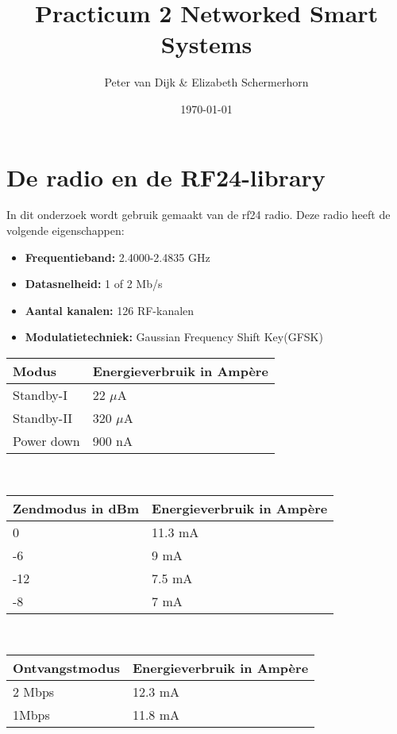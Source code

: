 \documentclass{article}
\author{Peter van Dijk \& Elizabeth Schermerhorn}
\date{\today}
\title{Practicum 2 Networked Smart Systems}
\begin{document}
\maketitle
\newpage
\tableofcontents
\clearpage
\appendix
\section{De radio en de RF24-library}
In dit onderzoek wordt gebruik gemaakt van de rf24 radio. Deze radio heeft de volgende eigenschappen:
	\begin{itemize}	
	\item\textbf{Frequentieband: }2.4000-2.4835 GHz
	\item\textbf{Datasnelheid: }1 of 2 Mb/s
	\item\textbf{Aantal kanalen: }126 RF-kanalen
	\item\textbf{Modulatietechniek: }Gaussian Frequency Shift Key(GFSK)
	\end{itemize}
\begin{tabular}{l||l}
\textbf{Modus}  & \textbf{Energieverbruik in Amp\`ere}     \\
\hline
Standby-I   & 22 $\mu$A    \\
Standby-II  & 320 $\mu$A     \\
Power down  & 900 nA 
\end{tabular}\\
\begin{tabular}{l||l}
\textbf{Zendmodus in dBm}  & \textbf{Energieverbruik in Amp\`ere}     \\
\hline
0   & 11.3 mA    \\
-6  & 9 mA     \\
-12  & 7.5 mA  \\
-8  & 7 mA
\end{tabular}\\
\begin{tabular}{l||l}
\textbf{Ontvangstmodus}  & \textbf{Energieverbruik in Amp\`ere}     \\
\hline
2 Mbps   & 12.3 mA    \\
1Mbps & 11.8 mA     
\end{tabular}
\end{document}
